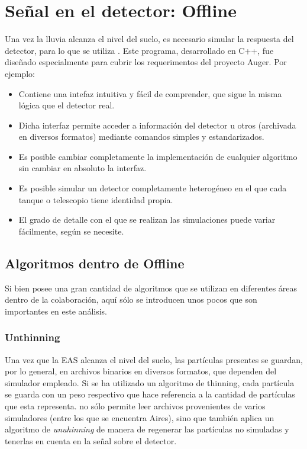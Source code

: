 	\section{Señal en el detector: Offline}
	
	Una vez la lluvia alcanza el nivel del suelo, es necesario simular la respuesta del detector, para lo que se utiliza \Offline{}.
	Este programa, desarrollado en C++, fue dise\~nado especialmente para cubrir los requerimentos del proyecto Auger. Por ejemplo:
	\begin{itemize}
	\item Contiene una intefaz intuitiva y f\'acil de comprender, que sigue la misma l\'ogica que el detector real.
	\item Dicha interfaz permite acceder a informaci\'on del detector u otros (archivada en diversos formatos) mediante comandos simples y estandarizados.
	\item Es posible cambiar completamente la implementaci\'on de cualquier algoritmo sin cambiar en absoluto la interfaz.
	\item Es posible simular un detector completamente heterog\'eneo en el que cada tanque o telescopio tiene identidad propia.
	\item El grado de detalle con el que se realizan las simulaciones puede variar f\'acilmente, seg\'un se necesite.
	\end{itemize}
	
	\subsection{Algoritmos dentro de Offline}
	
	Si bien \Offline{} posee una gran cantidad de algoritmos que se utilizan en diferentes \'areas dentro de la colaboraci\'on, aqu\'i s\'olo se introducen unos pocos que son importantes en este an\'alisis.
	
		\subsubsection{Unthinning}
		
		Una vez que la EAS alcanza el nivel del suelo, las part\'iculas presentes se guardan, por lo general, en archivos binarios en diversos formatos, que dependen del simulador empleado.
		Si se ha utilizado un algoritmo de thinning, cada part\'icula se guarda con un peso respectivo que hace referencia a la cantidad de part\'iculas que esta representa.
		\Offline{} no s\'olo permite leer archivos provenientes de varios simuladores (entre los que se encuentra {\sc Aires}), sino que tambi\'en aplica un algoritmo de \textit{unuhinning} de manera de regenerar las part\'iculas no simuladas y tenerlas en cuenta en la se\~nal sobre el detector.
		
